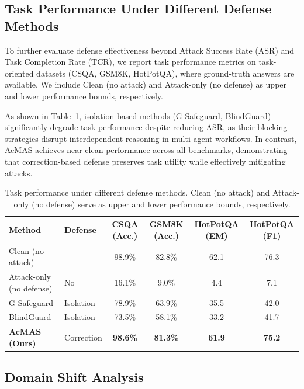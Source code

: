 \documentclass{article}
\theoremstyle{plain}
\theoremstyle{definition}
\theoremstyle{remark}
\begin{document}
\subsection{Task Performance Under Different Defense Methods}
\label{app:task}

To further evaluate defense effectiveness beyond Attack Success Rate (ASR) and Task Completion Rate (TCR), we report task performance metrics on task-oriented datasets (CSQA, GSM8K, HotPotQA), where ground-truth answers are available. We include Clean (no attack) and Attack-only (no defense) as upper and lower performance bounds, respectively.

As shown in Table~\ref{tab:task-perf}, isolation-based methods (G-Safeguard, BlindGuard) significantly degrade task performance despite reducing ASR, as their blocking strategies disrupt interdependent reasoning in multi-agent workflows. In contrast, AcMAS achieves near-clean performance across all benchmarks, demonstrating that correction-based defense preserves task utility while effectively mitigating attacks.

\begin{table}[h]
\caption{Task performance under different defense methods. 
Clean (no attack) and Attack-only (no defense) serve as 
upper and lower performance bounds, respectively.}
\label{tab:task-perf}
\centering
\begin{tabular}{llcccc}
\toprule
\textbf{Method} & \textbf{Defense} & \textbf{CSQA (Acc.)} 
& \textbf{GSM8K (Acc.)} & \textbf{HotPotQA (EM)} 
& \textbf{HotPotQA (F1)} \\
\midrule
Clean (no attack)        & —          & 98.9\% & 82.8\% & 62.1 & 76.3 \\
Attack-only (no defense) & No         & 16.1\% & 9.0\%  & 4.4  & 7.1  \\
G-Safeguard              & Isolation  & 78.9\% & 63.9\% & 35.5 & 42.0 \\
BlindGuard               & Isolation  & 73.5\% & 58.1\% & 33.2 & 41.7 \\
\textbf{AcMAS (Ours)}    & Correction & \textbf{98.6\%} 
& \textbf{81.3\%} & \textbf{61.9} & \textbf{75.2} \\
\bottomrule
\end{tabular}
\end{table}


\subsection{Domain Shift Analysis}
\label{app:domain_shift}
\end{document}
